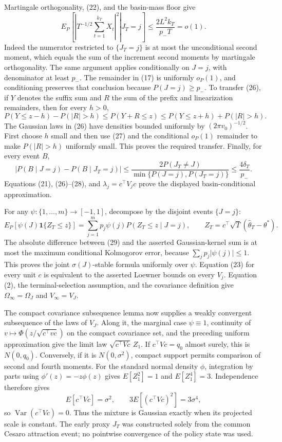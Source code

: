 Martingale orthogonality, (22), and the basin-mass floor give
\[
 E_P\!\left[\left.\left|T^{-1/2}\sum_{t=1}^{k_T}X_t\right|^2\right|J_T=j\right]
 \le \frac{2L^2k_T}{p_-T}=o(1).
\tag{27}
\]
Indeed the numerator restricted to \(\{J_T=j\}\) is at most the unconditional second moment, which equals the sum of the increment second moments by martingale orthogonality. The same argument applies conditionally on \(J=j\), with denominator at least \(p_-\). The remainder in (17) is uniformly \(o_P(1)\), and conditioning preserves that conclusion because \(P(J=j)\ge p_-\). To transfer (26), if \(Y\) denotes the suffix sum and \(R\) the sum of the prefix and linearization remainders, then for every \(h>0\),
\[
 P(Y\le z-h)-P(|R|>h)\le P(Y+R\le z)
 \le P(Y\le z+h)+P(|R|>h).
\]
The Gaussian laws in (26) have densities bounded uniformly by \((2\pi v_0)^{-1/2}\). First choose \(h\) small and then use (27) and the conditional \(o_P(1)\) remainder to make \(P(|R|>h)\) uniformly small. This proves the required transfer. Finally, for every event \(B\),
\[
 \left|P(B\mid J=j)-P(B\mid J_T=j)\right|
 \le \frac{2P(J_T\ne J)}{\min\{P(J=j),P(J_T=j)\}}
 \le\frac{4\delta_T}{p_-}.
\tag{28}
\]
Equations (21), (26)--(28), and \(\lambda_j=c^\top V_jc\) prove the displayed basin-conditional approximation.

For any \(\psi:\{1,\ldots,m\}\to[-1,1]\), decompose by the disjoint events \(\{J=j\}\):
\[
 E_P[\psi(J)\mathbf1\{Z_T\le z\}]
 =\sum_{j=1}^mp_j\psi(j)P(Z_T\le z\mid J=j),
 \qquad Z_T=c^\top\sqrt T(\widehat\theta_T-\theta^*).
\tag{29}
\]
The absolute difference between (29) and the asserted Gaussian-kernel sum is at most the maximum conditional Kolmogorov error, because \(\sum_jp_j|\psi(j)|\le1\). This proves the joint \(\sigma(J)\)-stable formula uniformly over \(\psi\). Equation (23) for every unit \(c\) is equivalent to the asserted Loewner bounds on every \(V_j\). Equation (2), the terminal-selection assumption, and the covariance definition give \(\Omega_\infty=\Omega_J\) and \(V_\infty=V_J\).

The compact covariance subsequence lemma now supplies a weakly convergent subsequence of the laws of \(V_J\). Along it, the marginal case \(\psi\equiv1\), continuity of \(v\mapsto\Phi(z/\sqrt{c^\top vc})\) on the compact covariance set, and the preceding uniform approximation give the limit law \(\sqrt{c^\top Vc}\,Z_1\). If \(c^\top Vc=q_0\) almost surely, this is \(N(0,q_0)\). Conversely, if it is \(N(0,\sigma^2)\), compact support permits comparison of second and fourth moments. For the standard normal density \(\phi\), integration by parts using \(\phi'(z)=-z\phi(z)\) gives \(E[Z_1^2]=1\) and \(E[Z_1^4]=3\). Independence therefore gives
\[
 E[c^\top Vc]=\sigma^2,
 \qquad 3E[(c^\top Vc)^2]=3\sigma^4,
\]
so \(\operatorname{Var}(c^\top Vc)=0\). Thus the mixture is Gaussian exactly when its projected scale is constant. The early proxy \(J_T\) was constructed solely from the common Cesaro attraction event; no pointwise convergence of the policy state was used.